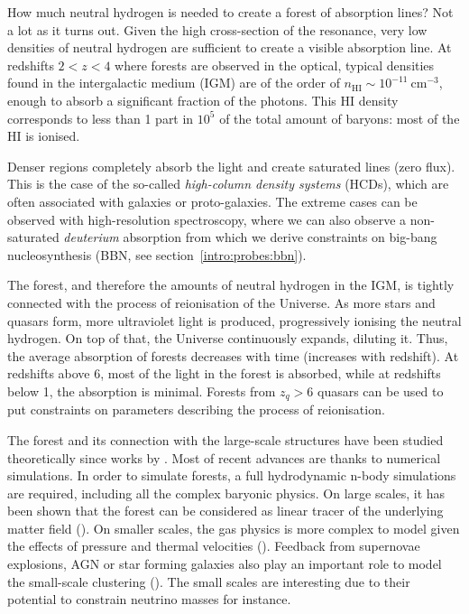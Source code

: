 How much neutral hydrogen is needed to create a forest of \lya 
absorption lines? Not a lot as it turns out. 
Given the high cross-section of the \lya resonance, 
very low densities of neutral hydrogen are sufficient to create a visible absorption line. 
At redshifts $2 < z < 4$ where \lya forests are observed in the optical, 
typical densities found in the intergalactic medium (IGM) are of the order of 
$n_\mathrm{HI} \sim {10^{-11}}~\unit{\centi\meter^{-3}}$,
enough to absorb a significant fraction of the photons. 
This HI density corresponds to 
less than 1 part in $10^5$ of the total amount of baryons: most of the HI is ionised.

Denser regions completely absorb the light and create saturated lines (zero flux). 
This is the case of the so-called \emph{high-column density systems} (HCDs), 
which are often associated with galaxies or proto-galaxies. The extreme cases 
can be observed with high-resolution spectroscopy, where we can also observe a non-saturated
\emph{deuterium} absorption from which we derive constraints on big-bang nucleosynthesis (BBN, 
see section~\ref{intro:probes:bbn}). 

The \lya forest, and therefore the amounts of neutral hydrogen in the IGM, 
is tightly connected with the process of reionisation of the Universe. 
As more stars and quasars form, more ultraviolet light is produced, 
progressively ionising the neutral hydrogen. On top of that, the Universe
continuously expands, diluting it. 
Thus, the average absorption of forests decreases with time (increases with redshift).
At redshifts above 6, most of the light in the forest is absorbed, 
while at redshifts below 1, the \lya absorption is minimal. 
Forests from $z_q>6$ quasars can be used to put constraints on parameters 
describing the process of reionisation. 

The \lya forest and its connection with the large-scale structures have been studied 
theoretically since works by \cite{gunnDensityNeutralHydrogen1965}. 
Most of recent advances are thanks to numerical simulations. 
In order to simulate forests, 
a full hydrodynamic n-body simulations are required, including all the 
complex baryonic physics. 
On large scales, it has been shown that the forest can be considered as 
linear tracer of the underlying matter field 
(\cite{mcdonaldObservedProbabilityDistribution2000, mcdonaldMeasurementCosmologicalGeometry2003, 
mcdonaldLinearTheoryPower2005}). On smaller scales, the gas physics is more 
complex to model given the effects of pressure and thermal velocities
(\cite{arinyo-i-pratsNonLinearPowerSpectrum2015}).
Feedback from supernovae explosions, AGN or star forming galaxies also play 
an important role to model the small-scale clustering (\cite{chabanierImpactAGNFeedback2020}). 
The small scales are interesting due to their potential to constrain neutrino masses for instance. 

